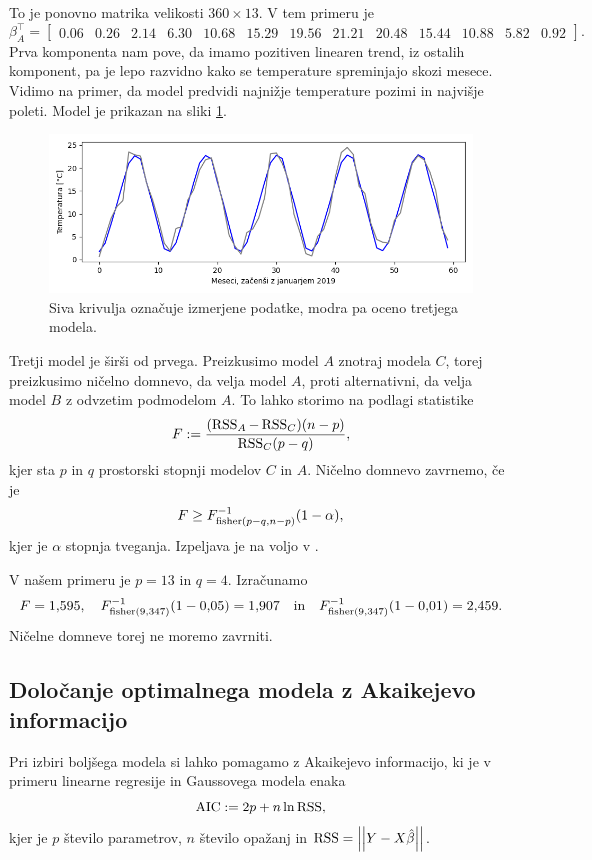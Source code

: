 \documentclass[12pt, a4paper]{article}
\begin{document}
To je ponovno matrika velikosti $360 \times 13$. V tem primeru je
\footnotesize
\[
    \beta_A^\top = \begin{bmatrix}
        0.06 & 0.26 & 2.14 & 6.30 & 10.68 & 15.29 & 
        19.56 & 21.21 & 20.48 & 15.44 & 10.88 & 5.82 & 0.92
    \end{bmatrix}.
\]
\normalsize
Prva komponenta nam pove, da imamo pozitiven linearen trend, 
iz ostalih komponent, pa je lepo razvidno kako se temperature
spreminjajo skozi mesece. Vidimo na primer, da model 
predvidi najnižje temperature pozimi in najvišje poleti.
Model je prikazan na sliki \ref{png:tretji}.
\begin{figure}[H]
    \centering
    \includegraphics[width=14cm]{Slike/tretji_model.png}
    \caption{Siva krivulja označuje izmerjene podatke, modra pa oceno 
    tretjega modela.}
    \label{png:tretji}
\end{figure}
Tretji model je širši od prvega. Preizkusimo model $A$ znotraj 
modela $C$, torej preizkusimo ničelno domnevo, da velja model $A$, 
proti alternativni, da velja model $B$ z odvzetim podmodelom $A$.
To lahko storimo na podlagi statistike
\[
    F := \frac{(\operatorname{RSS}_A - \operatorname{RSS}_C)(n-p)}{\operatorname{RSS}_C (p-q)},
\]
kjer sta $p$ in $q$ prostorski stopnji modelov $C$ in $A$. 
Ničelno domnevo zavrnemo, če je 
\[
    F \ge F^{-1}_{\operatorname{fisher}(p-q,n-p)}(1-\alpha),
\]
kjer je $\alpha$ stopnja tveganja. 
Izpeljava je na voljo v \cite{raic2}. 

V našem primeru je $p = 13$ in $q = 4$. Izračunamo 
\[
    F = 1{,}595, \quad
    F^{-1}_{\operatorname{fisher}(9,347)}(1-0{,}05) = 1{,}907 \quad \text{in} \quad
    F^{-1}_{\operatorname{fisher}(9,347)}(1-0{,}01) = 2{,}459.
\]
Ničelne domneve torej ne moremo zavrniti.

\subsection*{Določanje optimalnega modela z Akaikejevo informacijo}

Pri izbiri boljšega modela si lahko pomagamo z Akaikejevo informacijo, 
ki je v primeru linearne regresije in Gaussovega modela enaka
\[
    \operatorname{AIC} := 2p + n \ln \operatorname{RSS},
\]
kjer je $p$ število parametrov, $n$ število opažanj in $\operatorname{RSS} = \left\lvert\left\lvert Y - X\hat \beta\right\rvert\right\rvert$.
\end{document}
